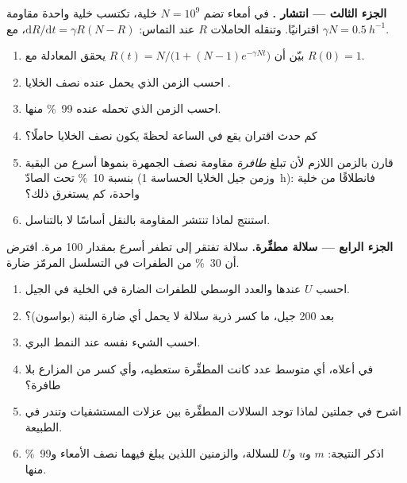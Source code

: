 \begin{problem}
\medskip
\noindent\textbf{الجزء الثالث --- انتشار .}
في أمعاء تضم $N = 10^{9}$ خلية، تكتسب خلية واحدة  مقاومة
اقترانيًا. وتنقله الحاملات $R$ عند التماس:
$\mathrm{d}R/\mathrm{d}t = \gamma R(N - R)$، مع $\gamma N =
\qty{0.5}{h^{-1}}$.
\begin{enumerate}[resume]
  \item بيّن أن $R(t) = N/\bigl(1 + (N - 1)e^{-\gamma N t}\bigr)$
        يحقق المعادلة مع $R(0) = 1$.
  \item احسب الزمن الذي يحمل عنده نصف الخلايا .
  \item احسب الزمن الذي تحمله عنده \qty{99}{\%} منها.
  \item كم حدث اقتران يقع في الساعة لحظةَ يكون نصف الخلايا حاملًا؟
  \item قارن بالزمن اللازم لأن تبلغ \emph{طافرة} مقاومة نصف الجمهرة
        بنموها أسرع من البقية بنسبة \qty{10}{\%} تحت الصادّ (وزمن جيل
        الخلايا الحساسة \qty{1}{h}): فانطلاقًا من خلية واحدة، كم
        يستغرق ذلك؟
  \item استنتج لماذا تنتشر المقاومة بالنقل أساسًا لا بالتناسل.
\end{enumerate}

\medskip
\noindent\textbf{الجزء الرابع --- سلالة مطفِّرة.}
سلالة تفتقر إلى  تطفر أسرع بمقدار \num{100} مرة.
افترض أن \qty{30}{\%} من الطفرات في التسلسل المرمّز ضارة.
\begin{enumerate}[resume]
  \item احسب $U$ عندها والعدد الوسطي للطفرات الضارة في الخلية في
        الجيل.
  \item بعد \num{200} جيل، ما كسر ذرية سلالة لا يحمل أي  ضارة
        البتة (بواسون)؟
  \item احسب الشيء نفسه عند النمط البري.
  \item في  أعلاه، أي متوسط عدد كانت المطفِّرة
        ستعطيه، وأي كسر من المزارع بلا طافرة؟
  \item اشرح في جملتين لماذا توجد السلالات المطفِّرة بين عزلات
        المستشفيات وتندر في الطبيعة.
  \item اذكر النتيجة: $m$ و$u$ و$U$ للسلالة، والزمنين اللذين يبلغ
        فيهما  نصف الأمعاء و\qty{99}{\%} منها.
\end{enumerate}
\end{problem}
